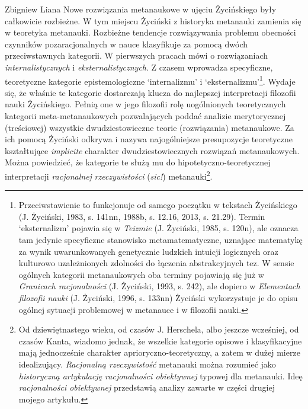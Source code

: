 \begin{artplenv}{Zbigniew Liana}
Nowe rozwiązania metanaukowe w ujęciu Życińskiego były całkowicie rozbieżne. W tym miejscu Życiński z historyka
metanauki zamienia się w teoretyka metanauki. Rozbieżne tendencje rozwiązywania problemu obecności czynników
pozaracjonalnych w nauce klasyfikuje za pomocą dwóch przeciwstawnych kategorii. W pierwszych pracach
mówi o rozwiązaniach \textit{internalistycznych} i \textit{eksternalistycznych}. Z czasem wprowadza specyficzne, teoretyczne
kategorie epistemologiczne `internalizmu' i `eksternalizmu'\footnote{Przeciwstawienie to funkcjonuje od samego
początku w tekstach Życińskiego \label{ref:RNDhYHdk6Gn9I}(J. Życiński, 1983, s. 141nn, 1988b, s. 12.16, 2013, s. 21.29). Termin
`eksternalizm' pojawia się w \textit{Teizmie} \label{ref:RNDqnijmYbBgM}(J. Życiński, 1985, s. 120n), ale oznacza tam
jedynie specyficzne stanowisko metamatematyczne, uznające matematykę za wynik uwarunkowanych genetycznie ludzkich
intuicji logicznych oraz kulturowo uzależnionych zdolności do łączenia abstrakcyjnych tez. W sensie ogólnych kategorii
metanaukowych oba terminy pojawiają się już w \textit{Granicach racjonalności} \label{ref:RND37pLqxd4Aa}(J. Życiński,
1993, s. 242), ale dopiero w \textit{Elementach filozofii nauki} \label{ref:RNDY1V0zunmmK}(J. Życiński, 1996, s. 133nn)
Życiński wykorzystuje je do opisu ogólnej sytuacji problemowej w metanauce i w filozofii nauki.}. Wydaje się, że
właśnie te kategorie dostarczają klucza do najlepszej interpretacji filozofii nauki Życińskiego. Pełnią one w jego
filozofii rolę uogólnionych teoretycznych kategorii meta-metanaukowych pozwalających poddać analizie merytorycznej
(treściowej) wszystkie dwudziestowieczne teorie (rozwiązania) metanaukowe. Za ich pomocą Życiński odkrywa i nazywa
najogólniejsze presupozycje teoretyczne kształtujące \textit{implicite} charakter dwudziestowiecznych rozwiązań
metanaukowych. Można powiedzieć, że kategorie te służą mu do hipotetyczno-teoretycznej interpretacji \textit{racjonalnej}
\textit{rzeczywistości} (\textit{sic!}) metanauki\footnote{Od dziewiętnastego wieku, od czasów J. Herschela, albo jeszcze
wcześniej, od czasów Kanta, wiadomo jednak, że wszelkie kategorie opisowe i klasyfikacyjne mają jednocześnie charakter
aprioryczno-teoretyczny, a zatem w dużej mierze idealizujący. \textit{Racjonalną rzeczywistość }metanauki można rozumieć
jako \textit{historyczną artykulację racjonalności obiektywnej} typowej dla metanauki. Ideę \textit{racjonalności
obiektywnej} przedstawią analizy zawarte w części drugiej mojego artykułu.}.


\end{artplenv}
